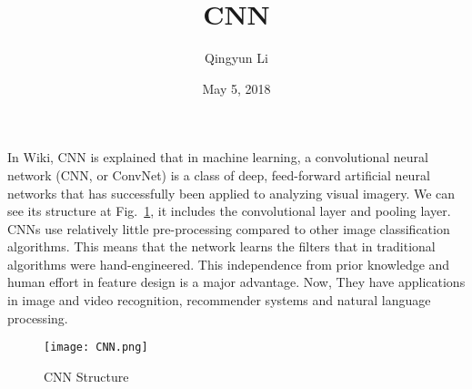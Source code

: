 \documentclass{article}
\author{Qingyun Li}
\date{May 5, 2018}
\title{CNN}
\begin{document}
\maketitle
 \par In Wiki, CNN is explained that in machine learning, a convolutional neural network (CNN, or ConvNet) is a class of deep, feed-forward artificial neural networks that has successfully been applied to analyzing visual imagery. We can see its structure at Fig.~\ref{CNN}, it includes the convolutional layer and pooling layer. CNNs use relatively little pre-processing compared to other image classification algorithms. This means that the network learns the filters that in traditional algorithms were hand-engineered. This independence from prior knowledge and human effort in feature design is a major advantage. Now, They have applications in image and video recognition, recommender systems\cite{van2013deep} and natural language processing\cite{collobert2008unified}.
\begin{figure}[htbp]
\begin{minipage}{1\linewidth}
\centering
\texttt{[image: CNN.png]}\\
\caption{CNN Structure}\label{CNN} 
\end{minipage}
\end{figure}


\end{document}
